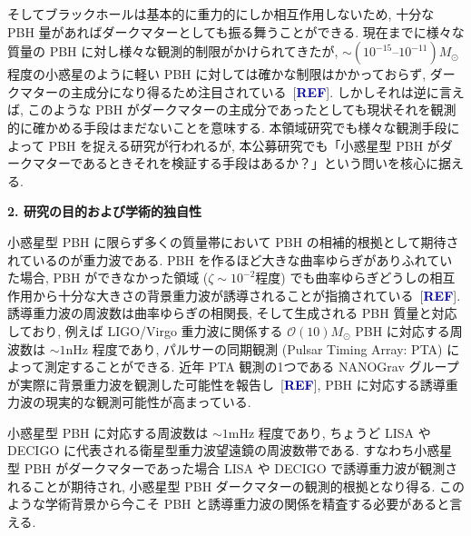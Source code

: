 \documentclass[11pt,a4paper,uplatex,dvipdfmx]{ujarticle} 		%
\newcommand{\研究課題名}{曲率ゆらぎの統計と原始ブラックホール量の精密対応}
\newcommand{\研究機関名}{名古屋大学}
\newcommand{\研究代表者氏名}{多田祐一郎}
\newcommand{\研究期間の最終元号年度}{4}  %
\newcommand{\calO}{\mathcal{O}}
\newcommand{\Blue}[1]{\textcolor{darkblue}{\sffamily\gtfamily\bfseries #1}}
\begin{document}
そしてブラックホールは基本的に重力的にしか相互作用しないため, 十分な PBH 量があればダークマターとしても振る舞うことができる.
現在までに様々な質量の PBH に対し様々な観測的制限がかけられてきたが, $\sim(10^{-15}\text{--}10^{-11})M_\odot$ 程度の小惑星のように軽い PBH に対しては確かな制限はかかっておらず, ダークマターの主成分になり得るため注目されている~[\Blue{REF}].
しかしそれは逆に言えば, このような PBH がダークマターの主成分であったとしても現状それを観測的に確かめる手段はまだないことを意味する.
本領域研究でも様々な観測手段によって PBH を捉える研究が行われるが,
本公募研究でも「小惑星型 PBH がダークマターであるときそれを検証する手段はあるか？」という問いを核心に据える.




\begin{mdframed}[roundcorner=0.5zw,
	innertopmargin=0.8zw,innerbottommargin=0.8zw,
	linecolor=black!50,linewidth=0.2zw,
	backgroundcolor=black!10]
	{\bfseries\gtfamily\sffamily\large 2. 研究の目的および学術的独自性}
\end{mdframed}

\noindent
小惑星型 PBH に限らず多くの質量帯において PBH の相補的根拠として期待されているのが重力波である.
PBH を作るほど大きな曲率ゆらぎがありふれていた場合, PBH ができなかった領域 ($\zeta\sim10^{-2}$程度) でも曲率ゆらぎどうしの相互作用から十分な大きさの背景重力波が誘導されることが指摘されている~[\Blue{REF}].
誘導重力波の周波数は曲率ゆらぎの相関長, そして生成される PBH 質量と対応しており, 
例えば LIGO/Virgo 重力波に関係する $\calO(10)M_\odot$ PBH に対応する周波数は $\sim1\mathrm{nHz}$ 程度であり,
パルサーの同期観測 (Pulsar Timing Array: PTA) によって測定することができる.
近年 PTA 観測の1つである NANOGrav グループが実際に背景重力波を観測した可能性を報告し~[\Blue{REF}],
PBH に対応する誘導重力波の現実的な観測可能性が高まっている.

小惑星型 PBH に対応する周波数は $\sim1\mathrm{mHz}$ 程度であり,
ちょうど LISA や DECIGO に代表される衛星型重力波望遠鏡の周波数帯である.
すなわち小惑星型 PBH がダークマターであった場合 LISA や DECIGO で誘導重力波が観測されることが期待され, 
小惑星型 PBH ダークマターの観測的根拠となり得る.
このような学術背景から今こそ PBH と誘導重力波の関係を精査する必要があると言える.
\end{document}
